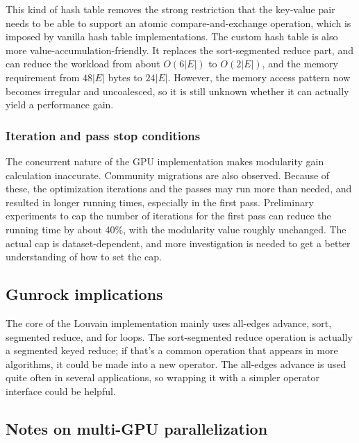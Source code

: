 \documentclass[10pt,oneside]{memoir}
\begin{document}
This kind of hash table removes the strong restriction that the
key-value pair needs to be able to support an atomic
compare-and-exchange operation, which is imposed by vanilla hash table
implementations. The custom hash table is also more
value-accumulation-friendly. It replaces the sort-segmented reduce part,
and can reduce the workload from about \(O(6|E|)\) to \(O(2|E|)\), and
the memory requirement from \(48|E|\) bytes to \(24|E|\). However, the
memory access pattern now becomes irregular and uncoalesced, so it is
still unknown whether it can actually yield a performance gain.

\hypertarget{iteration-and-pass-stop-conditions}{%
\subsubsection{Iteration and pass stop
conditions}\label{iteration-and-pass-stop-conditions}}

The concurrent nature of the GPU implementation makes modularity gain
calculation inaccurate. Community migrations are also observed. Because
of these, the optimization iterations and the passes may run more than
needed, and resulted in longer running times, especially in the first
pass. Preliminary experiments to cap the number of iterations for the
first pass can reduce the running time by about 40\%, with the
modularity value roughly unchanged. The actual cap is dataset-dependent,
and more investigation is needed to get a better understanding of how to
set the cap.

\hypertarget{gunrock-implications-3}{%
\subsection{Gunrock implications}\label{gunrock-implications-3}}

The core of the Louvain implementation mainly uses all-edges advance,
sort, segmented reduce, and for loops. The sort-segmented reduce
operation is actually a segmented keyed reduce; if that's a common
operation that appears in more algorithms, it could be made into a new
operator. The all-edges advance is used quite often in several
applications, so wrapping it with a simpler operator interface could be
helpful.

\hypertarget{notes-on-multi-gpu-parallelization-4}{%
\subsection{Notes on multi-GPU
parallelization}\label{notes-on-multi-gpu-parallelization-4}}
\end{document}
